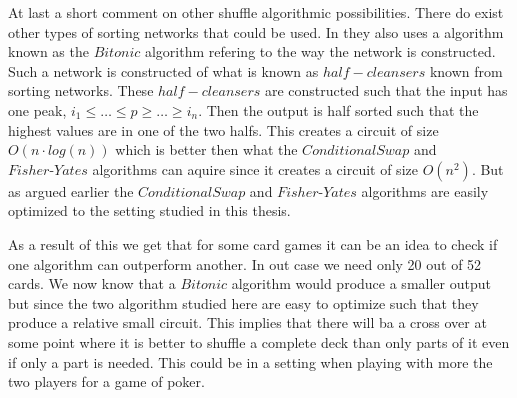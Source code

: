 At last a short comment on other shuffle algorithmic possibilities. There do exist other types of sorting networks that could be used. In  they also uses a algorithm known as the $Bitonic$ algorithm refering to the way the network is constructed. Such a network is constructed of what is known as $half-cleansers$ known from sorting networks. These $half-cleansers$ are constructed such that the input has one peak, $i_1\leq \dots \leq p \geq \dots \geq i_n$. Then the output is half sorted such that the highest values are in one of the two halfs. This creates a circuit of size $O(n\cdot log(n))$ which is better then what the $Conditional Swap$ and $Fisher\text{-}Yates$ algorithms can aquire since it creates a circuit of size $O(n^2)$. But as argued earlier the $Conditional Swap$ and $Fisher\text{-}Yates$ algorithms are easily optimized to the setting studied in this thesis.


As a result of this we get that for some card games it can be an idea to check if one algorithm can outperform another. In out case we need only 20 out of 52 cards. We now know that a $Bitonic$ algorithm would produce a smaller output but since the two algorithm studied here are easy to optimize such that they produce a relative small circuit. This implies that there will ba a cross over at some point where it is better to shuffle a complete deck than only parts of it even if only a part is needed. This could be in a setting when playing with more the two players for a game of poker.